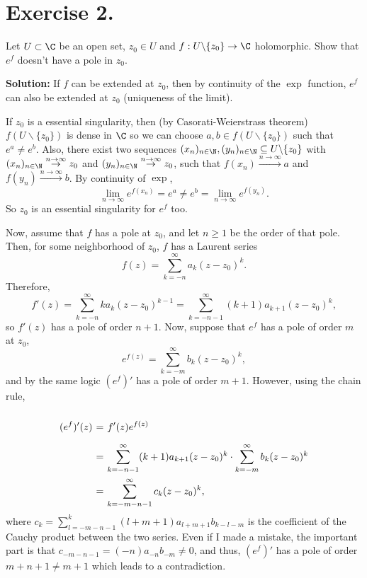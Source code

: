 \section*{Exercise 2.}

Let $U\subset \C$ be an open set, $z_0\in U$ and $f : U\backslash\{z_0\} \to \C$ holomorphic. Show that $e^{f}$ doesn't have a pole in $z_0$.

\textbf{Solution:} 
If $f$ can be extended at $z_0$, then by continuity of the $\exp$ function, $e^f$ can also be extended at $z_0$ (uniqueness of the limit). 

If $z_0$ is a essential singularity, then (by  Casorati-Weierstrass theorem) $f(U\backslash \{z_0\})$ is dense in $\C$ so we can choose $a,b\in f(U\backslash \{z_0\})$ such that $e^a \neq e^b$. Also, there exist two sequences $(x_n)_{n\in\N}, (y_n)_{n\in\N} \subseteq U\backslash \{z_0\}$ with $(x_n)_{n\in\N} \overset{n\to\infty}{\to} z_0$ and $(y_n)_{n\in\N} \overset{n\to\infty}{\to} z_0$, such that $f(x_n) \overset{n\to\infty}{\to} a$ and $f(y_n) \overset{n\to\infty}{\to} b$. By continuity of $\exp$,
\[ \lim_{n\to\infty} e^{f(x_n)} = e^a \neq e^b = \lim_{n\to\infty} e^{f(y_n)}. \]
So $z_0$ is an essential singularity for $e^f$ too.

Now, assume that $f$ has a pole at $z_0$, and let $n \geq 1$ be the order of that pole. Then, for some neighborhood of $z_0$, $f$ has a Laurent series
\[ f(z) = \sum_{k = -n}^{\infty} a_{k} (z-z_0)^{k}. \]
Therefore, 
\[ f'(z) = \sum_{k = -n}^{\infty} k a_{k} (z-z_0)^{k-1} = \sum_{k = -n-1}^{\infty} (k+1) a_{k+1} (z-z_0)^{k}, \]
so $f'(z)$ has a pole of order $n+1$. Now, suppose that $e^f$ has a pole of order $m$ at $z_0$,
\[ e^{f(z)} =  \sum_{k = -m}^{\infty} b_{k} (z-z_0)^{k}, \]
and by the same logic $(e^f)'$ has a pole of order $m+1$. However, using the chain rule,
\[ \everymath{\displaystyle}
\arraycolsep=1.8pt\def\arraystretch{2.5}
\begin{array}{rcl}
    (e^f)'(z) & = & f'(z) e^{f(z)}\\
    & = & \sum_{k = -n-1}^{\infty} (k+1) a_{k+1} (z-z_0)^{k} \cdot \sum_{k = -m}^{\infty} b_{k} (z-z_0)^{k}\\
    & = & \sum_{k = -m-n-1}^{\infty} c_k (z-z_0)^k,
\end{array} \]
where $c_k = \sum_{l = -m-n-1}^{k} (l+m+1) a_{l+m+1}b_{k-l-m}$ is the coefficient of the Cauchy product between the two series. Even if I made a mistake, the important part is that $c_{-m-n-1} = (-n)a_{-n} b_{-m} \neq 0$, and thus, $(e^{f})'$ has a pole of order $m+n+1 \neq m+1$ which leads to a contradiction.